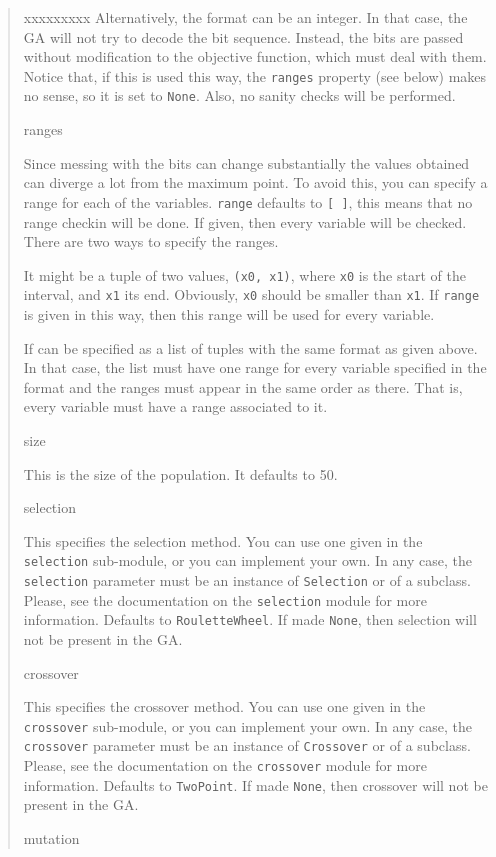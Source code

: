 \begin{boxedminipage}{\textwidth}
\begin{quote}
\begin{Ventry}{xxxxxxxxx}
Alternatively, the format can be an integer. In that case, the GA
will not try to decode the bit sequence. Instead, the bits are
passed without modification to the objective function, which must
deal with them. Notice that, if this is used this way, the
\texttt{ranges} property (see below) makes no sense, so it is set to
\texttt{None}. Also, no sanity checks will be performed.
          \item[ranges]


Since messing with the bits can change substantially the values
obtained can diverge a lot from the maximum point. To avoid this,
you can specify a range for each of the variables. \texttt{range}
defaults to \texttt{{[} {]}}, this means that no range checkin will be done.
If given, then every variable will be checked. There are two ways to
specify the ranges.

It might be a tuple of two values, \texttt{(x0, x1)}, where \texttt{x0} is the
start of the interval, and \texttt{x1} its end. Obviously, \texttt{x0} should
be smaller than \texttt{x1}. If \texttt{range} is given in this way, then this
range will be used for every variable.

If can be specified as a list of tuples with the same format as
given above. In that case, the list must have one range for every
variable specified in the format and the ranges must appear in the
same order as there. That is, every variable must have a range
associated to it.
          \item[size]


This is the size of the population. It defaults to 50.
          \item[selection]


This specifies the selection method. You can use one given in the
\texttt{selection} sub-module, or you can implement your own. In any
case, the \texttt{selection} parameter must be an instance of
\texttt{Selection} or of a subclass. Please, see the documentation on the
\texttt{selection} module for more information. Defaults to
\texttt{RouletteWheel}. If made \texttt{None}, then selection will not be
present in the GA.
          \item[crossover]


This specifies the crossover method. You can use one given in the
\texttt{crossover} sub-module, or you can implement your own. In any
case, the \texttt{crossover} parameter must be an instance of
\texttt{Crossover} or of a subclass. Please, see the documentation on the
\texttt{crossover} module for more information. Defaults to
\texttt{TwoPoint}. If made \texttt{None}, then crossover will not be
present in the GA.
          \item[mutation]



\end{Ventry}
\end{quote}
\end{boxedminipage}
